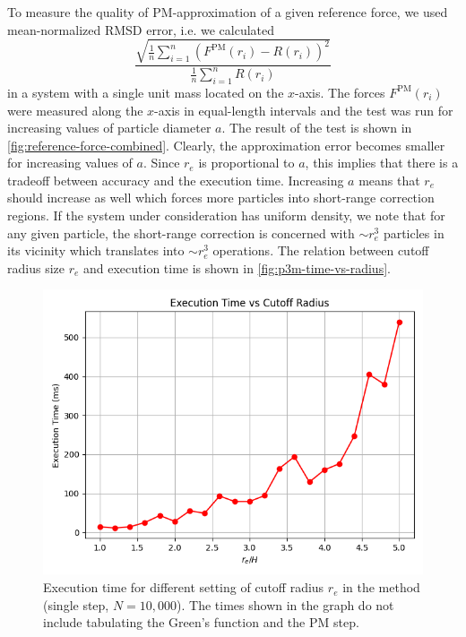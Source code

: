 To measure the quality of PM-approximation of a given reference force, we used mean-normalized RMSD error, i.e. we calculated
\begin{equation*}
    \frac{\sqrt{\frac{1}{n} \sum_{i=1}^{n} (F^\text{PM}(r_i) - R(r_i))^2}}{\frac{1}{n} \sum_{i=1}^{n} R(r_i)}
\end{equation*}
in a system with a single unit mass located on the $x$-axis.
The forces $F^\text{PM}(r_i)$ were measured along the $x$-axis in equal-length intervals and the test was run for increasing values of particle diameter $a$.
The result of the test is shown in \autoref{fig:reference-force-combined}.
Clearly, the approximation error becomes smaller for increasing values of $a$.
Since $r_e$ is proportional to $a$, this implies that there is a tradeoff between accuracy and the execution time.
Increasing $a$ means that $r_e$ should increase as well which forces more particles into short-range correction regions.
If the system under consideration has uniform density, we note that for any given particle, the short-range correction is concerned with $\sim r_e^3$ particles in its vicinity which translates into $\sim r_e^3$ operations.
The relation between cutoff radius size $r_e$ and execution time is shown in \autoref{fig:p3m-time-vs-radius}.
\begin{figure}[htp]
    \centering
    \includegraphics[scale=0.5]{img/time-vs-radius.png}
    \caption{Execution time for different setting of cutoff radius $r_e$ in the \PThreeM{} method (single step, $N=10{,}000$).
    The times shown in the graph do not include tabulating the Green's function and the PM step.}
    \label{fig:p3m-time-vs-radius}
\end{figure}
